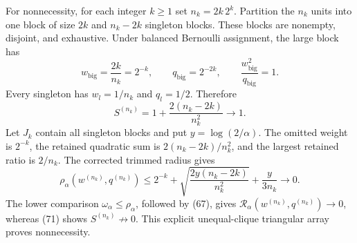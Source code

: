 For nonnecessity, for each integer \(k\ge1\) set \(n_k=2k\,2^k\). Partition the \(n_k\) units into one block of size \(2k\) and \(n_k-2k\) singleton blocks. These blocks are nonempty, disjoint, and exhaustive. Under balanced Bernoulli assignment, the large block has
\[
 w_{\mathrm{big}}=\frac{2k}{n_k}=2^{-k},
 \qquad q_{\mathrm{big}}=2^{-2k},
 \qquad \frac{w_{\mathrm{big}}^2}{q_{\mathrm{big}}}=1.
\tag{70}
\]
Every singleton has \(w_l=1/n_k\) and \(q_l=1/2\). Therefore
\[
 S^{(n_k)}=1+\frac{2(n_k-2k)}{n_k^2}\longrightarrow1.
\tag{71}
\]
Let \(J_k\) contain all singleton blocks and put \(y=\log(2/\alpha)\). The omitted weight is \(2^{-k}\), the retained quadratic sum is \(2(n_k-2k)/n_k^2\), and the largest retained ratio is \(2/n_k\). The corrected trimmed radius gives
\[
 \rho_\alpha(w^{(n_k)},q^{(n_k)})
 \le2^{-k}+\sqrt{\frac{2y(n_k-2k)}{n_k^2}}
       +\frac{y}{3n_k}
 \longrightarrow0.
\tag{72}
\]
The lower comparison \(\omega_\alpha\le\rho_\alpha\), followed by (67), gives \(\mathcal R_\alpha(w^{(n_k)},q^{(n_k)})\to0\), whereas (71) shows \(S^{(n_k)}\not\to0\). This explicit unequal-clique triangular array proves nonnecessity.
